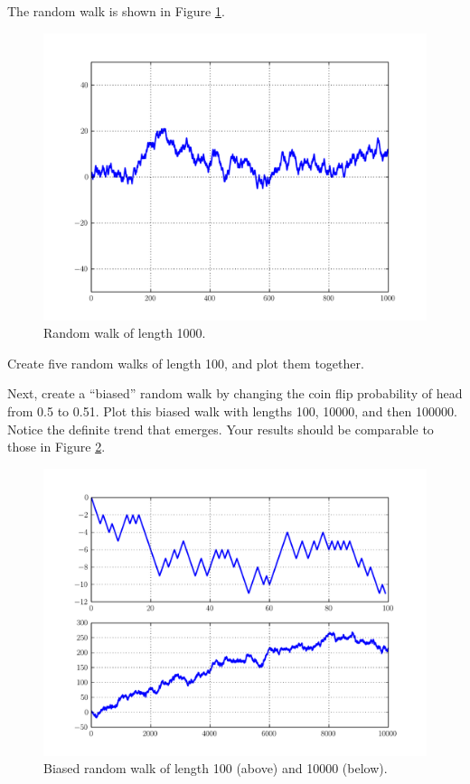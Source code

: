 The random walk is shown in Figure \ref{fig:PandasRandomWalk}.

\begin{figure}
\centering
\includegraphics[width=.7 \textwidth]{randomWalk.pdf}
\caption{Random walk of length 1000.}
\label{fig:PandasRandomWalk}
\end{figure}

\begin{problem}
Create five random walks of length 100, and plot them together.

Next, create a ``biased'' random walk by changing the coin flip probability of head from 0.5 to 0.51.
Plot this biased walk with lengths 100, 10000, and then 100000. Notice the definite trend that emerges.
Your results should be comparable to those in Figure \ref{pandas:biasedRandomWalk}.
\end{problem}

\begin{figure}
\centering
\includegraphics[width=.7 \textwidth]{biasedRandomWalk.pdf}
\caption{Biased random walk of length 100 (above) and 10000 (below).}
\label{pandas:biasedRandomWalk}
\end{figure}

